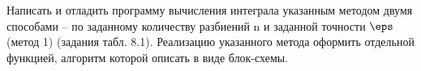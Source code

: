 Написать и отладить программу вычисления интеграла указанным
методом двумя способами – по заданному количеству разбиений n и заданной
точности $\eps$ (метод 1) (задания табл. 8.1).
Реализацию указанного метода оформить отдельной функцией, алгоритм
которой описать в виде блок-схемы.